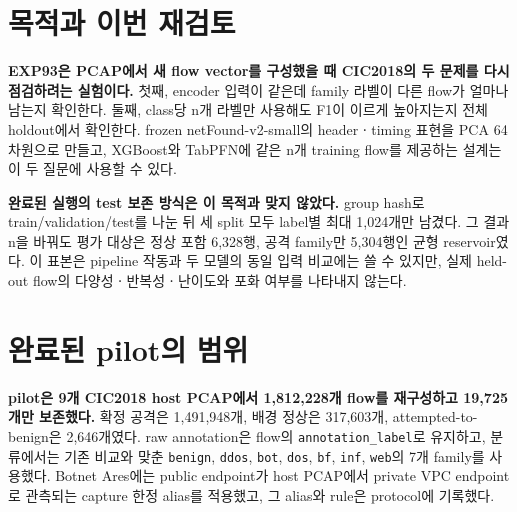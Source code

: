 
\usepackage{tabularx}


\section{목적과 이번 재검토}
\textbf{EXP93은 PCAP에서 새 flow vector를 구성했을 때 CIC2018의 두 문제를 다시 점검하려는 실험이다.} 첫째, encoder 입력이 같은데 family 라벨이 다른 flow가 얼마나 남는지 확인한다. 둘째, class당 n개 라벨만 사용해도 F1이 이르게 높아지는지 전체 holdout에서 확인한다. frozen netFound-v2-small의 headerㆍtiming 표현을 PCA 64차원으로 만들고, XGBoost와 TabPFN에 같은 n개 training flow를 제공하는 설계는 이 두 질문에 사용할 수 있다.

\textbf{완료된 실행의 test 보존 방식은 이 목적과 맞지 않았다.} group hash로 train/validation/test를 나눈 뒤 세 split 모두 label별 최대 1,024개만 남겼다. 그 결과 n을 바꿔도 평가 대상은 정상 포함 6,328행, 공격 family만 5,304행인 균형 reservoir였다. 이 표본은 pipeline 작동과 두 모델의 동일 입력 비교에는 쓸 수 있지만, 실제 held-out flow의 다양성ㆍ반복성ㆍ난이도와 포화 여부를 나타내지 않는다.

\section{완료된 pilot의 범위}
\textbf{pilot은 9개 CIC2018 host PCAP에서 1,812,228개 flow를 재구성하고 19,725개만 보존했다.} 확정 공격은 1,491,948개, 배경 정상은 317,603개, attempted-to-benign은 2,646개였다. raw annotation은 flow의 \texttt{annotation\_label}로 유지하고, 분류에서는 기존 비교와 맞춘 \texttt{benign}, \texttt{ddos}, \texttt{bot}, \texttt{dos}, \texttt{bf}, \texttt{inf}, \texttt{web}의 7개 family를 사용했다. Botnet Ares에는 public endpoint가 host PCAP에서 private VPC endpoint로 관측되는 capture 한정 alias를 적용했고, 그 alias와 rule은 protocol에 기록했다.

